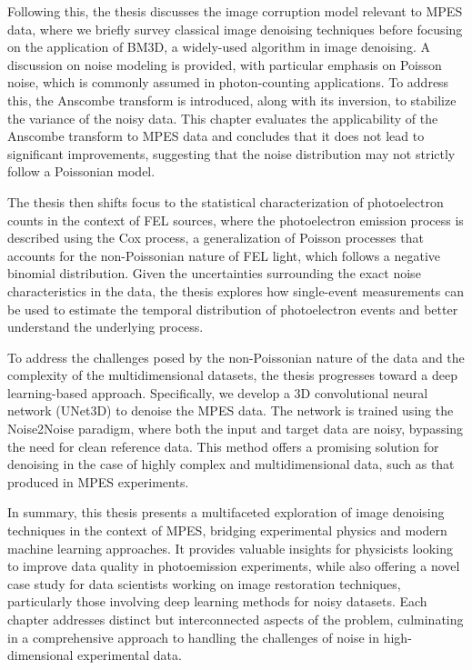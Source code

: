 Following this, the thesis discusses the image corruption model relevant to \gls{MPES} data, where we briefly survey classical image denoising techniques before focusing on the application of \gls{BM3D}, a widely-used algorithm in image denoising. A discussion on noise modeling is provided, with particular emphasis on Poisson noise, which is commonly assumed in photon-counting applications. To address this, the Anscombe transform is introduced, along with its inversion, to stabilize the variance of the noisy data. This chapter evaluates the applicability of the Anscombe transform to \gls{MPES} data and concludes that it does not lead to significant improvements, suggesting that the noise distribution may not strictly follow a Poissonian model.

The thesis then shifts focus to the statistical characterization of photoelectron counts in the context of \gls{FEL} sources, where the photoelectron emission process is described using the Cox process, a generalization of Poisson processes that accounts for the non-Poissonian nature of \gls{FEL} light, which follows a negative binomial distribution. Given the uncertainties surrounding the exact noise characteristics in the data, the thesis explores how single-event measurements can be used to estimate the temporal distribution of photoelectron events and better understand the underlying process.

To address the challenges posed by the non-Poissonian nature of the data and the complexity of the multidimensional datasets, the thesis progresses toward a deep learning-based approach. Specifically, we develop a 3D convolutional neural network (UNet3D) to denoise the \gls{MPES} data. The network is trained using the Noise2Noise paradigm, where both the input and target data are noisy, bypassing the need for clean reference data. This method offers a promising solution for denoising in the case of highly complex and multidimensional data, such as that produced in \gls{MPES} experiments.

In summary, this thesis presents a multifaceted exploration of image denoising techniques in the context of \gls{MPES}, bridging experimental physics and modern machine learning approaches. It provides valuable insights for physicists looking to improve data quality in photoemission experiments, while also offering a novel case study for data scientists working on image restoration techniques, particularly those involving deep learning methods for noisy datasets. Each chapter addresses distinct but interconnected aspects of the problem, culminating in a comprehensive approach to handling the challenges of noise in high-dimensional experimental data.

